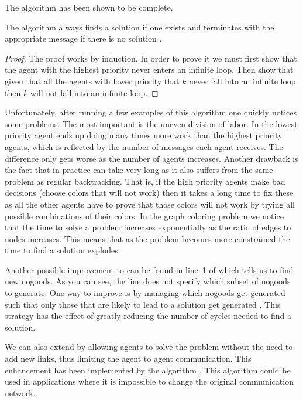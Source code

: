 The  algorithm has been shown to be complete.

\begin{theorem}
  The  algorithm always finds a solution if one exists and
  terminates with the appropriate message if there is no solution
  \cite{yokoo98a}.
\end{theorem}
\begin{proof}
  The proof works by induction. In order to prove it we must first
  show that the agent with the highest priority never enters an
  infinite loop. Then show that given that all the agents with lower
  priority that $k$ never fall into an infinite loop then $k$ will not
  fall into an infinite loop.
\end{proof}

Unfortunately, after running a few examples of this algorithm one
quickly notices some problems. The most important is the uneven
division of labor. In  the lowest priority agent ends up
doing many times more work than the highest priority agents, which is
reflected by the number of messages each agent receives. The
difference only gets worse as the number of agents increases. Another
drawback is the fact that in practice  can take very long as
it also suffers from the same problem as regular backtracking. That
is, if the high priority agents make bad decisions (choose colors that
will not work) then it takes a long time to fix these as all the other
agents have to prove that those colors will not work by trying all
possible combinations of their colors. In the graph coloring problem
we notice that the time to solve a problem increases exponentially as
the ratio of edges to nodes increases. This means that as the problem
becomes more constrained the time to find a solution explodes.

Another possible improvement to  can be found
in line~1 of  which tells us to find new nogoods.
As you can see, the line does not specify which subset of nogoods to
generate.  One way to improve  is by managing which nogoods
get generated such that only those that are likely to lead to a
solution get generated \cite{jiang05a,jiang06c}. This strategy has the
effect of greatly reducing the number of cycles needed to find a
solution.

We can also extend  by allowing agents to
solve the problem without the need to add new links, thus limiting the
agent to agent communication. This enhancement has been implemented by
the  algorithm \cite{bessiere05a}. This
algorithm could be used in applications where it is impossible to
change the original communication network.

